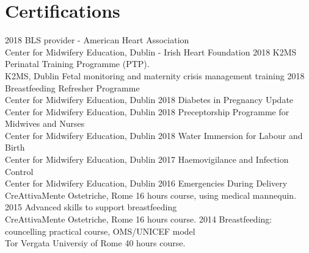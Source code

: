 \documentclass[11pt]{friggeri-cv}
\begin{document}
\vspace{-15pt}
\section{Certifications}
\begin{entrylist}
  \entry
    {2018}
    {BLS provider - American Heart Association}
    {\\Center for Midwifery Education, Dublin - Irish Heart Foundation}
    {\vspace{-10pt}}
  \entry
    {2018}
    {K2MS Perinatal Training Programme (PTP).}
    {\\K2MS, Dublin}
    {Fetal monitoring and maternity crisis management training}
  \entry
    {2018}
    {Breastfeeding Refresher Programme}
    {\\Center for Midwifery Education, Dublin}
    {\vspace{-10pt}}
  \entry
    {2018}
    {Diabetes in Pregnancy Update}
    {\\Center for Midwifery Education, Dublin}
    {\vspace{-10pt}}
  \entry
    {2018}
    {Preceptorship Programme for Midwives and Nurses}
    {\\Center for Midwifery Education, Dublin}
    {\vspace{-10pt}}
  \entry
    {2018}
    {Water Immersion for Labour and Birth}
    {\\Center for Midwifery Education, Dublin}
    {\vspace{-10pt}}
  \entry
    {2017}
    {Haemovigilance and Infection Control}
    {\\Center for Midwifery Education, Dublin}
    {\vspace{-10pt}}
  \entry
    {2016}
    {Emergencies During Delivery}
    {\\CreAttivaMente Ostetriche, Rome}
    {16 hours course, using medical mannequin.}
  \entry
    {2015}
    {Advanced skills to support breastfeeding}
    {\\CreAttivaMente Ostetriche, Rome}
    {16 hours course.}
  \entry
    {2014}
    {Breastfeeding: councelling practical course, OMS/UNICEF model}
    {\\Tor Vergata Universiy of Rome}
    {40 hours course.}
\end{entrylist}

\vspace{-15pt}
\end{document}
